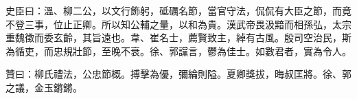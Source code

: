\begin{pinyinscope}
 史臣曰：溫、柳二公，以文行飾躬，砥礪名節，當官守法，侃侃有大臣之節，而竟不登三事，位止正卿。所以知公輔之量，以和為貴。漢武帝畏汲黯而相孫弘，太宗重魏徵而委玄齡，其旨遠也。韋、崔名士，薦賢致主，綽有古風。殷司空治民，斯為循吏，而忠規壯節，至晚不衰。徐、郭讜言，鬱為佳士。如數君者，實為令人。



 贊曰：柳氏禮法，公忠節概。搏擊為優，彌綸則隘。夏卿獎拔，晦叔匡將。徐、郭之議，金玉鏘鏘。



\end{pinyinscope}